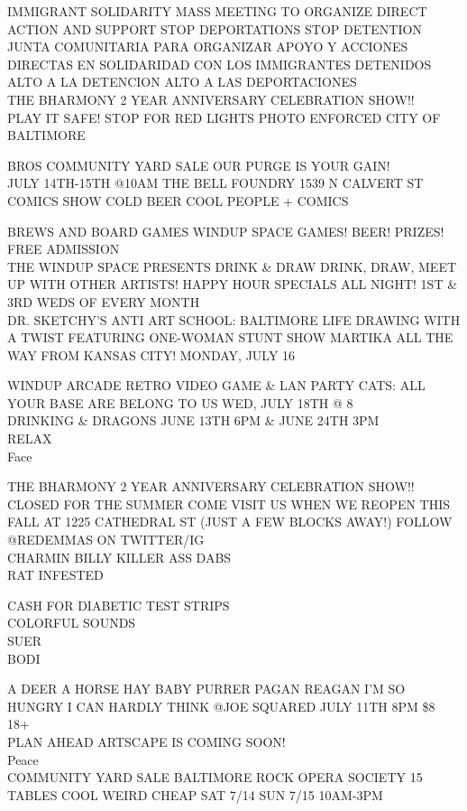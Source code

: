 \documentclass[10pt,letterpaper]{article}
\begin{document}
IMMIGRANT SOLIDARITY MASS MEETING TO ORGANIZE DIRECT ACTION AND SUPPORT STOP DEPORTATIONS STOP DETENTION\\
JUNTA COMUNITARIA PARA ORGANIZAR APOYO Y ACCIONES DIRECTAS EN SOLIDARIDAD CON LOS IMMIGRANTES DETENIDOS ALTO A LA DETENCION ALTO A LAS DEPORTACIONES\\
THE BHARMONY 2 YEAR ANNIVERSARY CELEBRATION SHOW!!\\
PLAY IT SAFE!  STOP FOR RED LIGHTS PHOTO ENFORCED CITY OF BALTIMORE

BROS COMMUNITY YARD SALE OUR PURGE IS YOUR GAIN!\\
JULY 14TH{-}15TH @10AM THE BELL FOUNDRY 1539 N CALVERT ST\\
COMICS SHOW COLD BEER COOL PEOPLE + COMICS

BREWS AND BOARD GAMES WINDUP SPACE GAMES!  BEER!  PRIZES!  FREE ADMISSION\\
THE WINDUP SPACE PRESENTS DRINK \& DRAW DRINK, DRAW, MEET UP WITH OTHER ARTISTS!  HAPPY HOUR SPECIALS ALL NIGHT!  1ST \& 3RD WEDS OF EVERY MONTH\\
DR. SKETCHY'S ANTI ART SCHOOL: BALTIMORE LIFE DRAWING WITH A TWIST FEATURING ONE{-}WOMAN STUNT SHOW MARTIKA ALL THE WAY FROM KANSAS CITY! MONDAY, JULY 16

WINDUP ARCADE RETRO VIDEO GAME \& LAN PARTY CATS: ALL YOUR BASE ARE BELONG TO US WED, JULY 18TH @ 8\\
DRINKING \& DRAGONS JUNE 13TH 6PM \& JUNE 24TH 3PM\\
RELAX\\
Face

THE BHARMONY 2 YEAR ANNIVERSARY CELEBRATION SHOW!!\\
CLOSED FOR THE SUMMER COME VISIT US WHEN WE REOPEN THIS FALL AT 1225 CATHEDRAL ST (JUST A FEW BLOCKS AWAY!) FOLLOW @REDEMMAS ON TWITTER/IG\\
CHARMIN BILLY KILLER ASS DABS\\
RAT INFESTED

CASH FOR DIABETIC TEST STRIPS\\
COLORFUL SOUNDS\\
SUER\\
BODI

A DEER A HORSE HAY BABY PURRER PAGAN REAGAN I'M SO HUNGRY I CAN HARDLY THINK @JOE SQUARED JULY 11TH 8PM \$8 18+\\
PLAN AHEAD ARTSCAPE IS COMING SOON!\\
Peace\\
COMMUNITY YARD SALE BALTIMORE ROCK OPERA SOCIETY 15 TABLES COOL WEIRD CHEAP SAT 7/14 SUN 7/15 10AM{-}3PM
\end{document}
